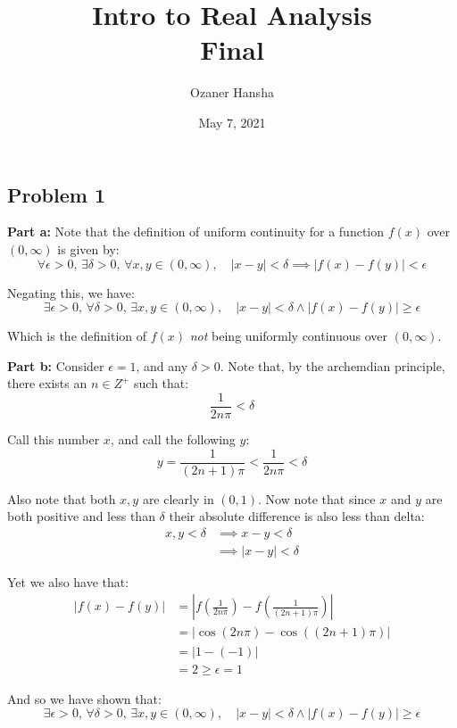 \documentclass{article}
\begin{document}
\title{Intro to Real Analysis\\Final}
\author{Ozaner Hansha}
\date{May 7, 2021}
\maketitle

\subsection*{Problem 1}
\noindent\textbf{Part a:} Note that the definition of uniform continuity for a function $f(x)$ over $(0,\infty)$ is given by:
$$\forall\epsilon>0,\,\exists\delta>0,\,\forall x,y\in (0,\infty),\quad |x-y|<\delta\implies |f(x)-f(y)|<\epsilon$$

Negating this, we have:
$$\exists\epsilon>0,\,\forall\delta>0,\,\exists x,y\in (0,\infty),\quad |x-y|<\delta\wedge |f(x)-f(y)|\ge\epsilon$$

Which is the definition of $f(x)$ \textit{not} being uniformly continuous over $(0,\infty)$.
\bigskip

\noindent\textbf{Part b:} Consider $\epsilon=1$, and any $\delta>0$. Note that, by the archemdian principle, there exists an $n\in Z^+$ such that:
$$\frac{1}{2n\pi}<\delta$$

Call this number $x$, and call the following $y$:
$$y=\frac{1}{(2n+1)\pi}<\frac{1}{2n\pi}<\delta$$

Also note that both $x,y$ are clearly in $(0,1)$. Now note that since $x$ and $y$ are both positive and less than $\delta$ their absolute difference is also less than delta:
\begin{align*}
  x,y<\delta&\implies x-y<\delta\tag{x,y>0}\\
  &\implies |x-y|<\delta\tag{x,y>0}
\end{align*}

Yet we also have that:
\begin{align*}
  |f(x)-f(y)|&=\left|f\left(\frac{1}{2n\pi}\right)-f\left(\frac{1}{(2n+1)\pi}\right)\right|\tag{def. of $x,y$}\\
  &=\left|\cos\left(2n\pi\right)-\cos\left((2n+1)\pi\right)\right|\tag{def. of $f(x)$}\\
  &=\left|1-(-1)\right|\\
  &=2\ge\epsilon=1
\end{align*}

And so we have shown that:
$$\exists\epsilon>0,\,\forall\delta>0,\,\exists x,y\in (0,\infty),\quad |x-y|<\delta\wedge |f(x)-f(y)|\ge\epsilon$$
\end{document}
